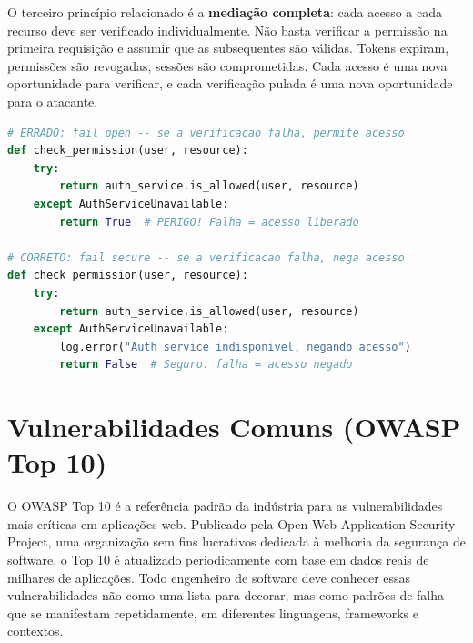 O terceiro princípio relacionado é a \textbf{mediação completa}: cada acesso a
cada recurso deve ser verificado individualmente. Não basta verificar a permissão
na primeira requisição e assumir que as subsequentes são válidas. Tokens expiram,
permissões são revogadas, sessões são comprometidas. Cada acesso é uma nova
oportunidade para verificar, e cada verificação pulada é uma nova oportunidade
para o atacante.

\begin{lstlisting}[language=Python, caption={Fail secure vs. fail open}]
# ERRADO: fail open -- se a verificacao falha, permite acesso
def check_permission(user, resource):
    try:
        return auth_service.is_allowed(user, resource)
    except AuthServiceUnavailable:
        return True  # PERIGO! Falha = acesso liberado

# CORRETO: fail secure -- se a verificacao falha, nega acesso
def check_permission(user, resource):
    try:
        return auth_service.is_allowed(user, resource)
    except AuthServiceUnavailable:
        log.error("Auth service indisponivel, negando acesso")
        return False  # Seguro: falha = acesso negado
\end{lstlisting}

\section{Vulnerabilidades Comuns (OWASP Top 10)}

O OWASP Top 10 é a referência padrão da indústria para as vulnerabilidades mais
críticas em aplicações web. Publicado pela Open Web Application Security Project,
uma organização sem fins lucrativos dedicada à melhoria da segurança de software,
o Top 10 é atualizado periodicamente com base em dados reais de milhares de
aplicações. Todo engenheiro de software deve conhecer essas vulnerabilidades não
como uma lista para decorar, mas como padrões de falha que se manifestam
repetidamente, em diferentes linguagens, frameworks e contextos.

